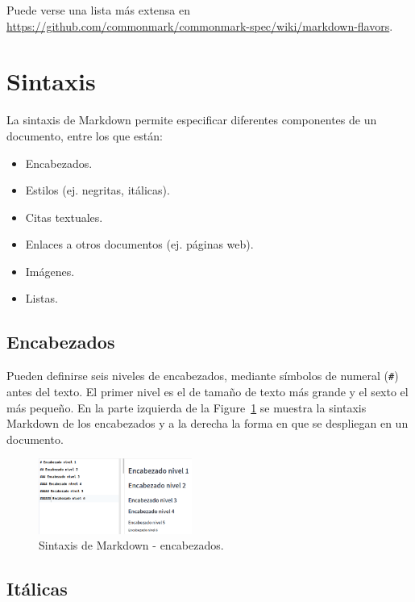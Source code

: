 \documentclass[
  letterpaper,
  DIV=11,
  numbers=noendperiod]{scrreprt}
\providecommand{\tightlist}{%
  \setlength{\itemsep}{0pt}\setlength{\parskip}{0pt}}\usepackage{longtable,booktabs,array}
\begin{document}
Puede verse una lista más extensa en
\url{https://github.com/commonmark/commonmark-spec/wiki/markdown-flavors}.

\hypertarget{sintaxis}{%
\section{Sintaxis}\label{sintaxis}}

La sintaxis de Markdown permite especificar diferentes componentes de un
documento, entre los que están:

\begin{itemize}
\tightlist
\item
  Encabezados.
\item
  Estilos (ej. negritas, itálicas).
\item
  Citas textuales.
\item
  Enlaces a otros documentos (ej. páginas web).
\item
  Imágenes.
\item
  Listas.
\end{itemize}

\hypertarget{encabezados}{%
\subsection{Encabezados}\label{encabezados}}

Pueden definirse seis niveles de encabezados, mediante símbolos de
numeral (\texttt{\#}) antes del texto. El primer nivel es el de tamaño
de texto más grande y el sexto el más pequeño. En la parte izquierda de
la Figure~\ref{fig-md-encabezados} se muestra la sintaxis Markdown de
los encabezados y a la derecha la forma en que se despliegan en un
documento.

\begin{figure}

{\centering \includegraphics[width=1.98in,height=\textheight]{./img/md-encabezados.png}

}

\caption{\label{fig-md-encabezados}Sintaxis de Markdown - encabezados.}

\end{figure}

\hypertarget{ituxe1licas}{%
\subsection{Itálicas}\label{ituxe1licas}}
\end{document}
